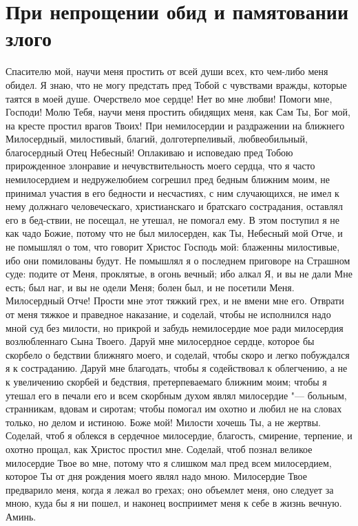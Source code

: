 \section{При непрощении обид и памятовании злого}
 


Спасителю мой, научи меня простить от всей души всех, кто чем-либо меня обидел. Я знаю, что не могу предстать пред Тобой с чувствами вражды, которые таятся в моей душе. Очерствело мое сердце! Нет во мне любви! Помоги мне, Господи! Молю Тебя, научи меня простить обидящих меня, как Сам Ты, Бог мой, на кресте простил врагов Твоих! При немилосердии и раздражении на ближнего Милосердный, милостивый, благий, долготерпеливый, любвеобильный, благосердный Отец Небесный! Оплакиваю и исповедаю пред Тобою прирожденное злонравие и нечувствительность моего сердца, что я часто немилосердием и недружелюбием согрешил пред бедным ближним моим, не принимал участия в его бедности и несчастиях, с ним случающихся, не имел к нему должнаго человеческаго, христианскаго и братскаго сострадания, оставлял его в бед-ствии, не посещал, не утешал, не помогал ему. В этом поступил я не как чадо Божие, потому что не был милосерден, как Ты, Небесный мой Отче, и не помышлял о том, что говорит Христос Господь мой: блаженны милостивые, ибо они помилованы будут. Не помышлял я о последнем приговоре на Страшном суде: подите от Меня, проклятые, в огонь вечный; ибо алкал Я, и вы не дали Мне есть; был наг, и вы не одели Меня; болен был, и не посетили Меня. Милосердный Отче! Прости мне этот тяжкий грех, и не вмени мне его. Отврати от меня тяжкое и праведное наказание, и соделай, чтобы не исполнился надо мной суд без милости, но прикрой и забудь немилосердие мое ради милосердия возлюбленнаго Сына Твоего. Даруй мне милосердное сердце, которое бы скорбело о бедствии ближняго моего, и соделай, чтобы скоро и легко побуждался я к состраданию. Даруй мне благодать, чтобы я содействовал к облегчению, а не к увеличению скорбей и бедствия, претерпеваемаго ближним моим; чтобы я утешал его в печали его и всем скорбным духом являл милосердие "--- больным, странникам, вдовам и сиротам; чтобы помогал им охотно и любил не на словах только, но делом и истиною. Боже мой! Милости хочешь Ты, а не жертвы. Соделай, чтоб я облекся в сердечное милосердие, благость, смирение, терпение, и охотно прощал, как Христос простил мне. Соделай, чтоб познал великое милосердие Твое во мне, потому что я слишком мал пред всем милосердием, которое Ты от дня рождения моего являл надо мною. Милосердие Твое предварило меня, когда я лежал во грехах; оно объемлет меня, оно следует за мною, куда бы я ни пошел, и наконец восприимет меня к себе в жизнь вечную. Аминь. 



